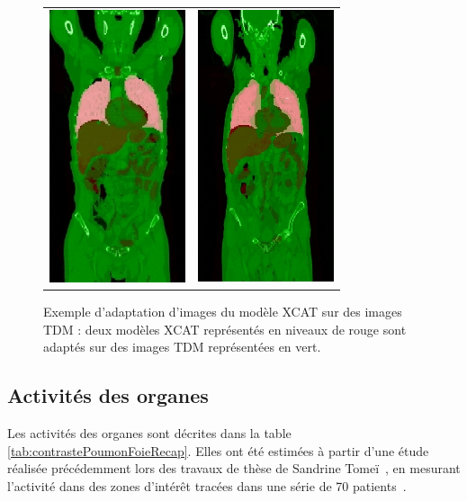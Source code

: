\begin{figure}
 \centering
 \begin{tabular}{c c}
 \includegraphics[width=4cm]{images/adapt_bru_jea} &
 \includegraphics[width=4cm]{images/adapt_cha_chr}
 \end{tabular}
 \caption[Exemple d’adaptation d’images du modèle XCAT sur des images TDM]{ Exemple d’adaptation d’images du modèle XCAT sur des images TDM : deux modèles XCAT représentés en niveaux de rouge sont adaptés sur des images TDM représentées en vert.}
 \label{fig:adaptXCAT}
\end{figure}


\subsection{Activités des organes}

Les activités des organes sont décrites dans la table \ref{tab:contrastePoumonFoieRecap}. Elles ont été estimées à partir d'une étude réalisée précédemment lors des travaux de thèse de Sandrine Tomeï~\cite{tomei2008development}, en mesurant l'activité dans des zones d'intérêt tracées dans une série de 70 patients~\cite{tomei2010oncopet_db}.

